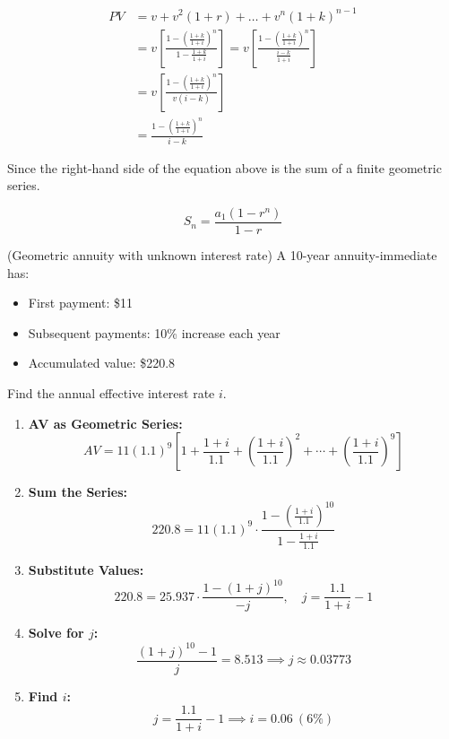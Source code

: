 \begin{align*}
    PV &= v + v^2 (1 + r) + \dots + v^n (1 + k)^{n-1} \\
    & = v \left[ \frac{1 - \left( \frac{1 + k}{1 + i} \right)^n}{1 - \frac{1 + k}{1 + i}} \right]  = v \left[ \frac{1 - \left( \frac{1 + k}{1 + i} \right)^n}{\frac{i - k}{1 + i}} \right] \\
    &= v \left[ \frac{1 - \left( \frac{1 + k}{1 + i} \right)^n}{v(i - k)} \right] \\
    &=\frac{1 - \left( \frac{1 + k}{1 + i} \right)^n}{i - k}
\end{align*}


\begin{comments}
    Since the right-hand side of the equation above is the sum of a finite geometric series. 
\end{comments}

\[
S_n = \frac{a_1 (1 - r^n)}{1 - r}
\]

\begin{example}(Geometric annuity with unknown interest rate)
    A 10-year annuity-immediate has:
\begin{itemize}
    \item First payment: \$11
    \item Subsequent payments: 10\% increase each year
    \item Accumulated value: \$220.8
\end{itemize}
Find the annual effective interest rate $i$.
\begin{enumerate}
    \item \textbf{AV as Geometric Series:}
    \[
    AV = 11(1.1)^9 \left[1 + \frac{1+i}{1.1} + \left(\frac{1+i}{1.1}\right)^2 + \cdots + \left(\frac{1+i}{1.1}\right)^9 \right]
    \]
    
    \item \textbf{Sum the Series:}
    \[
    220.8 = 11(1.1)^9 \cdot \frac{1 - \left(\frac{1+i}{1.1}\right)^{10}}{1 - \frac{1+i}{1.1}}
    \]
    
    \item \textbf{Substitute Values:}
    \[
    220.8 = 25.937 \cdot \frac{1 - (1 + j)^{10}}{-j}, \quad j = \frac{1.1}{1+i} - 1
    \]
    
    \item \textbf{Solve for $j$:}
    \[
    \frac{(1 + j)^{10} - 1}{j} = 8.513 \implies j \approx 0.03773
    \]
    
    \item \textbf{Find $i$:}
    \[
    j = \frac{1.1}{1+i} - 1 \implies i = \boxed{0.06} \ (6\%)
    \]
\end{enumerate}
\end{example}


